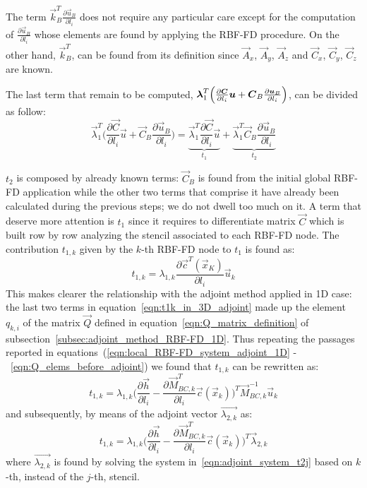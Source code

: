 \medskip
The term $\vec{k}_B^T \frac{\partial \vec{u}_B}{\partial l_i}$ does not require any particular care except for the computation of $\frac{\partial \vec{u}_B}{\partial l_i}$ whose elements are found by applying the RBF-FD procedure. On the other hand, $\vec{k}_B^T$, can be found from its definition since $\vec{A}_x$, $\vec{A}_y$, $\vec{A}_z$ and $\vec{C}_x$, $\vec{C}_y$, $\vec{C}_z$ are known.

\medskip
The last term that remain to be computed, $\vec{\lambda}_1^T \Bigl( \frac{\partial \vec{C}}{\partial l_i}\vec{u} + \vec{C}_B\frac{\partial \vec{u}_B}{\partial l_i} \Bigr)$, can be divided as follow:
\begin{equation}
	\vec{\lambda}_1^T \biggl( \frac{\partial \vec{C}}{\partial l_i}\vec{u} + \vec{C}_B\frac{\partial \vec{u}_B}{\partial l_i} \biggr) = \underbrace{\vec{\lambda}_1^T \frac{\partial \vec{C}}{\partial l_i} \vec{u}}_{t_1} + \underbrace{\vec{\lambda}_1^T \vec{C}_B \frac{\partial \vec{u}_B}{\partial l_i}}_{t_2}
\end{equation}

$t_2$ is composed by already known terms: $\vec{C}_B$ is found from the initial global RBF-FD application while the other two terms that comprise it have already been calculated during the previous steps; we do not dwell too much on it. A term that deserve more attention is $t_1$ since it requires to differentiate matrix $\vec{C}$ which is built row by row analyzing the stencil associated to each RBF-FD node.
The contribution $t_{1,k}$ given by the $k$-th RBF-FD node to $t_1$ is found as:
\begin{equation}
	\label{eqn:t1k_in_3D_adjoint}
	t_{1,k} = \lambda_{1,k} \frac{\partial \vec{c}^T(\vec{x}_K)}{\partial l_i} \vec{u}_k
\end{equation}
This makes clearer the relationship with the adjoint method applied in 1D case: the last two terms in equation~\eqref{eqn:t1k_in_3D_adjoint} made up the element $q_{k,i}$ of the matrix $\vec{Q}$ defined in equation~\eqref{eqn:Q_matrix_definition} of subsection~\ref{subsec:adjoint_method_RBF-FD_1D}. Thus repeating the passages reported in equations~(\ref{eqn:local_RBF-FD_system_adjoint_1D} -~\ref{eqn:Q_elems_before_adjoint}) we found that $t_{1,k}$ can be rewritten as:
\begin{equation}
	 t_{1,k} = \lambda_{1,k} \biggl( \frac{\partial \vec{h}}{\partial l_i} - \frac{\partial \vec{M}_{BC,k}^T}{\partial l_i} \vec{c}(\vec{x}_k) \biggr)^T \vec{M}_{BC,k}^{-1} \vec{u}_k
\end{equation}
and subsequently, by means of the adjoint vector $\vec{\lambda_{2,k}}$ as:
\begin{equation}
	t_{1,k} = \lambda_{1,k} \biggl( \frac{\partial \vec{h}}{\partial l_i} - \frac{\partial \vec{M}_{BC,k}^T}{\partial l_i} \vec{c}(\vec{x}_k) \biggr)^T \vec{\lambda}_{2,k}
\end{equation}
where $\vec{\lambda_{2,k}}$ is found by solving the system in~\eqref{eqn:adjoint_system_t2j} based on $k$-th, instead of the $j$-th, stencil.

